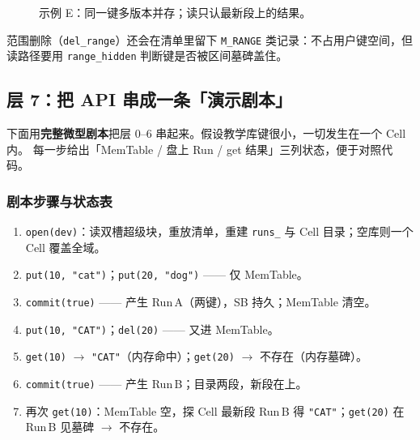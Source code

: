 \begin{figure}[H]
\centering
{}
\caption{示例 E：同一键多版本并存；读只认最新段上的结果。}
\end{figure}

范围删除（\texttt{del\_range}）还会在清单里留下 \texttt{M\_RANGE} 类记录：不占用户键空间，但读路径要用 \texttt{range\_hidden} 判断键是否被区间墓碑盖住。

\subsection{层 7：把 API 串成一条「演示剧本」}
\label{sec:cd-demo}

下面用\textbf{完整微型剧本}把层 0--6 串起来。假设教学库键很小，一切发生在一个 Cell 内。
每一步给出「MemTable / 盘上 Run / get 结果」三列状态，便于对照代码。

\subsubsection{剧本步骤与状态表}
\begin{enumerate}[leftmargin=1.6em]
  \item \texttt{open(dev)}：读双槽超级块，重放清单，重建 \texttt{runs\_} 与 Cell 目录；空库则一个 Cell 覆盖全域。
  \item \texttt{put(10, "cat")}；\texttt{put(20, "dog")} —— 仅 MemTable。
  \item \texttt{commit(true)} —— 产生 Run\,A（两键），SB 持久；MemTable 清空。
  \item \texttt{put(10, "CAT")}；\texttt{del(20)} —— 又进 MemTable。
  \item \texttt{get(10)} $\to$ \texttt{"CAT"}（内存命中）；\texttt{get(20)} $\to$ 不存在（内存墓碑）。
  \item \texttt{commit(true)} —— 产生 Run\,B；目录两段，新段在上。
  \item 再次 \texttt{get(10)}：MemTable 空，探 Cell 最新段 Run\,B 得 \texttt{"CAT"}；\texttt{get(20)} 在 Run\,B 见墓碑 $\to$ 不存在。
\end{enumerate}

